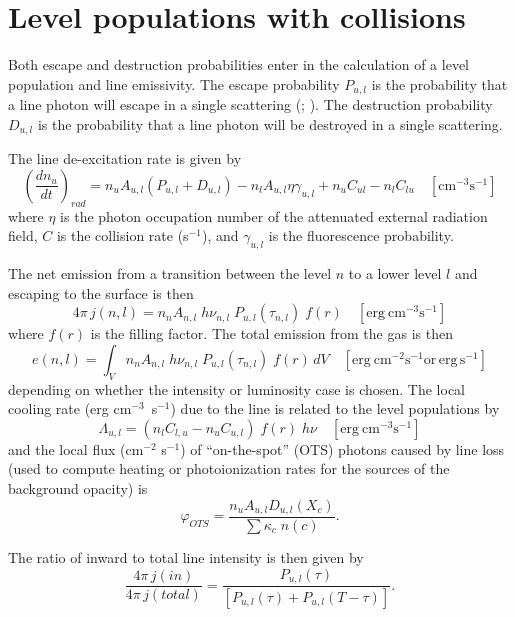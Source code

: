 \section{Level populations with collisions }

Both escape and destruction probabilities enter in the calculation of
a level population and line emissivity.
The escape probability $P_{u,l}$ is
the probability that a line photon will escape in a single scattering
(\citealp{Elitzur1983}; \citealp{Elitzur1984}).
The destruction probability $D_{u,l}$ is
the probability that a line photon will be destroyed in a single scattering.

The line de-excitation rate is given by
\begin{equation}
{\left( {\frac{{d{n_u}}}{{dt}}} \right)_{rad}} = {n_u}{A_{u,l}}\left(
{{P_{u,l}} + {D_{u,l}}} \right) - {n_l}{A_{u,l}}\eta {\gamma _{u,l}} +
{n_u}{C_{ul}} - {n_l}{C_{lu}}\quad
 [\mathrm{cm}^{-3} \mathrm{s}^{-1}]
\end{equation}
where $\eta$ is the photon occupation number of the attenuated external radiation
field, $C$ is the collision rate (s$^{-1}$), and $\gamma _{u,l}$
is the fluorescence probability.

The net emission from a transition between the level $n$ to a lower level
$l$ and escaping to the surface is then
\begin{equation}
4\pi \,j(n,l) = {n_n}{A_{n,l}}\;h{\nu _{n,l}}\;{P_{u,l}}({\tau
_{n,l}})\;f(r)\quad
 [\mathrm{erg~cm}^{-3} \mathrm{s}^{-1}]
\end{equation}
where $f(r)$ is the filling factor.
The total emission from the gas is then
\begin{equation}
e(n,l) = \int_V {{n_n}{A_{n,l}}\;h{\nu _{n,l}}\;{P_{u,l}}({\tau
_{n,l}})\;f(r)} \,dV\quad
 [\mathrm{erg~cm}^{-2} \mathrm{s}^{-1} \mathrm{or\, erg\, s}^{-1}]
\end{equation}
depending on whether the intensity or luminosity case is chosen.
The local
cooling rate (erg cm$^{-3}$~s$^{-1}$) due to the line is related
to the level populations by
\begin{equation}
{\Lambda _{u,l}} = \left( {{n_l}{C_{l,u}} - {n_u}{C_{u,l}}}
\right)\;f(r)\;h\nu \quad
 [\mathrm{erg~cm}^{-3} \mathrm{s}^{-1}]
\end{equation}
and the local flux (cm$^{-2}$ s$^{-1}$) of ``on-the-spot'' (OTS)
photons caused by
line loss (used to compute heating or photoionization rates
for the sources of the background opacity) is
\begin{equation}
{\varphi _{OTS}} = \frac{{{n_u}{A_{u,l}}{D_{u,l}}({X_c})}}{{\sum {{\kappa
_c}\;n(c)} }}.
\end{equation}

The ratio of inward to total line intensity is then given by
\begin{equation}
\frac{{4\pi \,j(in)}}{{4\pi \,j(total)}} = \frac{{{P_{u,l}}\left( \tau
\right)}}{{\left[ {{P_{u,l}}\left( \tau  \right) + {P_{u,l}}\left( {T -
\tau } \right)} \right]}}.
\end{equation}

